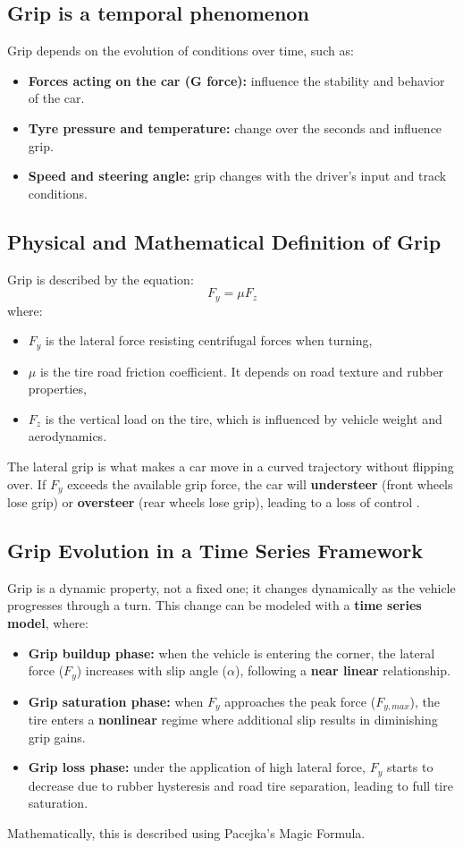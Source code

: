 \documentclass[a4paper,final,12pt]{report}
\begin{document}
\subsection{Grip is a temporal phenomenon}
Grip depends on the evolution of conditions over time, such as:
\begin{itemize}
    \item \textbf{Forces acting on the car (G force):} influence the stability and behavior of the car.
    \item \textbf{Tyre pressure and temperature:} change over the seconds and influence grip.
    \item \textbf{Speed and steering angle:} grip changes with the driver's input and track conditions.
\end{itemize}


\subsection{Physical and Mathematical Definition of Grip}
Grip is described by the equation:
\begin{equation}
    F_y = \mu F_z
\end{equation}
where:
\begin{itemize}
    \item $F_y$ is the lateral force resisting centrifugal forces when turning,
    \item $\mu$ is the tire road friction coefficient. It depends on road texture and rubber properties,
    \item $F_z$ is the vertical load on the tire, which is influenced by vehicle weight and aerodynamics.
\end{itemize}
The lateral grip is what makes a car move in a curved trajectory without flipping over. If $F_y$ exceeds the available grip force, the car will \textbf{understeer} (front wheels lose grip) or \textbf{oversteer} (rear wheels lose grip), leading to a loss of control \cite{Milliken1995}.

\subsection{Grip Evolution in a Time Series Framework}
Grip is a dynamic property, not a fixed one; it changes dynamically as the vehicle progresses through a turn. This change can be modeled with a \textbf{time series model}, where:
\begin{itemize}
    \item \textbf{Grip buildup phase:} when the vehicle is entering the corner, the lateral force ($F_y$) increases with slip angle ($\alpha$), following a \textbf{near linear} relationship.
    \item \textbf{Grip saturation phase:} when $F_y$ approaches the peak force ($F_{y,max}$), the tire enters a \textbf{nonlinear} regime where additional slip results in diminishing grip gains.
    \item \textbf{Grip loss phase:} under the application of high lateral force, $F_y$ starts to decrease due to rubber hysteresis and road tire separation, leading to full tire saturation.
\end{itemize}
Mathematically, this is described using Pacejka's Magic Formula.
\end{document}
